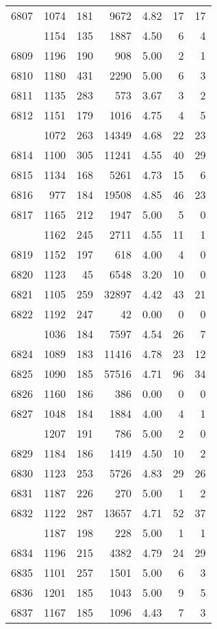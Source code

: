 \documentclass[
]{article}
\begin{document}
\begin{table}
\begin{tabular}[t]{lrrrrrr}
6807 & 1074 & 181 & 9672 & 4.82 & 17 & 17\\
\addlinespace
6808 & 1154 & 135 & 1887 & 4.50 & 6 & 4\\
6809 & 1196 & 190 & 908 & 5.00 & 2 & 1\\
6810 & 1180 & 431 & 2290 & 5.00 & 6 & 3\\
6811 & 1135 & 283 & 573 & 3.67 & 3 & 2\\
6812 & 1151 & 179 & 1016 & 4.75 & 4 & 5\\
\addlinespace
6813 & 1072 & 263 & 14349 & 4.68 & 22 & 23\\
6814 & 1100 & 305 & 11241 & 4.55 & 40 & 29\\
6815 & 1134 & 168 & 5261 & 4.73 & 15 & 6\\
6816 & 977 & 184 & 19508 & 4.85 & 46 & 23\\
6817 & 1165 & 212 & 1947 & 5.00 & 5 & 0\\
\addlinespace
6818 & 1162 & 245 & 2711 & 4.55 & 11 & 1\\
6819 & 1152 & 197 & 618 & 4.00 & 4 & 0\\
6820 & 1123 & 45 & 6548 & 3.20 & 10 & 0\\
6821 & 1105 & 259 & 32897 & 4.42 & 43 & 21\\
6822 & 1192 & 247 & 42 & 0.00 & 0 & 0\\
\addlinespace
6823 & 1036 & 184 & 7597 & 4.54 & 26 & 7\\
6824 & 1089 & 183 & 11416 & 4.78 & 23 & 12\\
6825 & 1090 & 185 & 57516 & 4.71 & 96 & 34\\
6826 & 1160 & 186 & 386 & 0.00 & 0 & 0\\
6827 & 1048 & 184 & 1884 & 4.00 & 4 & 1\\
\addlinespace
6828 & 1207 & 191 & 786 & 5.00 & 2 & 0\\
6829 & 1184 & 186 & 1419 & 4.50 & 10 & 2\\
6830 & 1123 & 253 & 5726 & 4.83 & 29 & 26\\
6831 & 1187 & 226 & 270 & 5.00 & 1 & 2\\
6832 & 1122 & 287 & 13657 & 4.71 & 52 & 37\\
\addlinespace
6833 & 1187 & 198 & 228 & 5.00 & 1 & 1\\
6834 & 1196 & 215 & 4382 & 4.79 & 24 & 29\\
6835 & 1101 & 257 & 1501 & 5.00 & 6 & 3\\
6836 & 1201 & 185 & 1043 & 5.00 & 9 & 5\\
6837 & 1167 & 185 & 1096 & 4.43 & 7 & 3\\

\end{tabular}
\end{table}
\end{document}
